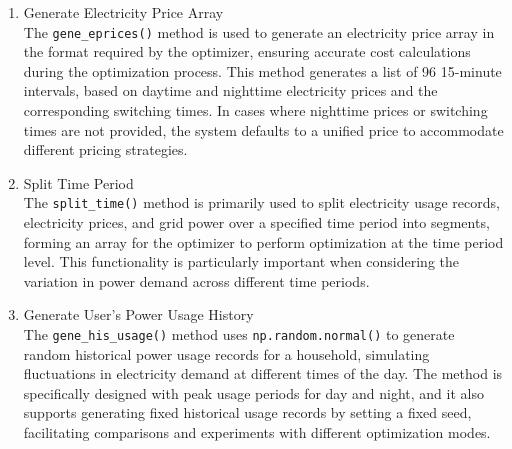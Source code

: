 \documentclass[
english,
ruledheaders=section,%
class=report,%
thesis={type=Report},%
accentcolor=9c,%
custommargins=true,%
marginpar=false,%
parskip=half-,%
fontsize=11pt,%
logofile={img/tuda_logo.pdf}, %
]{tudapub}
\begin{document}
\begin{enumerate}

        \item Generate Electricity Price Array\\
        The \texttt{gene\_eprices()} method is used to generate an electricity price array in the format required by the optimizer, ensuring accurate cost calculations during the optimization process. This method generates a list of 96 15-minute intervals, based on daytime and nighttime electricity prices and the corresponding switching times. In cases where nighttime prices or switching times are not provided, the system defaults to a unified price to accommodate different pricing strategies.



        \item Split Time Period\\
        The \texttt{split\_time()} method is primarily used to split electricity usage records, electricity prices, and grid power over a specified time period into segments, forming an array for the optimizer to perform optimization at the time period level. This functionality is particularly important when considering the variation in power demand across different time periods.



        \item Generate User's Power Usage History\\
        The \texttt{gene\_his\_usage()} method uses \texttt{np.random.normal()} to generate random historical power usage records for a household, simulating fluctuations in electricity demand at different times of the day. The method is specifically designed with peak usage periods for day and night, and it also supports generating fixed historical usage records by setting a fixed seed, facilitating comparisons and experiments with different optimization modes.



\end{enumerate}
\end{document}
